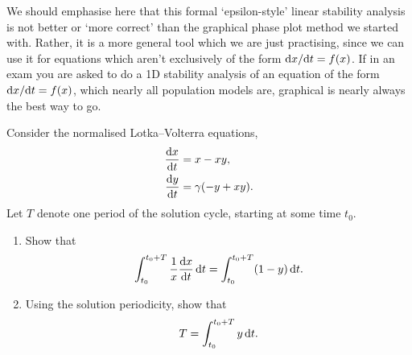 \documentclass[a4paper, 12pt]{article}
\begin{document}
\begin{enumerate}[label={\bf \arabic{*}.\;}, ref={\arabic{*}},itemsep=3ex, left=0ex]
{\begin{enumerate}[label=(\alph*)]
      \end{enumerate}
      We should emphasise here that this formal `epsilon-style' linear stability analysis is not better or `more correct' than the graphical phase plot method we started with. Rather, it is a more general tool which we are just practising, since we can use it for equations which aren't exclusively of the form $\fd{x}{t}=f(x)$. If in an exam you are asked to do a 1D stability analysis of an equation of the form $\fd{x}{t}=f(x)$, which nearly all population models are, graphical is nearly always the best way to go.

    }


    {
      Consider the normalised Lotka--Volterra equations,
      \begin{subequations}
        \begin{align}
          \fd{x}{t}&= x - x y, \\
          \fd{y}{t}&= \gamma(-y + x y).
        \end{align}
      \end{subequations}
      Let $T$ denote one period of the solution cycle, starting at some time $t_{0}$.
      \begin{enumerate}[label=(\alph{*})]
        \item Show that
          \begin{equation}
            \int_{t_0}^{t_0+T}\frac{1}{x}\fd{x}{t}\,\d{t} =
            \int_{t_0}^{t_0+T}(1-y)\,\d{t}.
          \end{equation}

        \item Using the solution periodicity, show that
          \begin{equation}
            \label{Tiden1}
            T = \int_{t_0}^{t_0+T}y\,{\mathrm d}{t}.
          \end{equation}


\end{enumerate}}
\end{enumerate}
\end{document}
